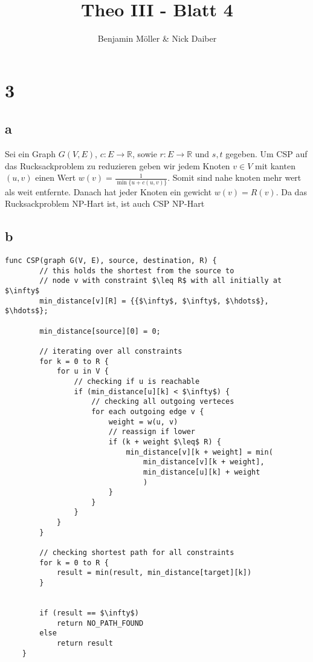 \documentclass{article}
\title{Theo III - Blatt 4}
\author{Benjamin Möller \& Nick Daiber}
\begin{document}
\maketitle
\section*{3}
\subsection*{a}
Sei ein Graph $G(V, E)$, $c:E\rightarrow \mathbb R$, sowie $r:E\rightarrow \mathbb R$ und $s, t$ gegeben.
Um CSP auf das Rucksackproblem zu reduzieren geben wir
jedem Knoten $v\in V$ mit kanten $(u, v)$ einen Wert $w(v) = \frac{1}{\min\{u+c(u,v)\}}$.
Somit sind nahe knoten mehr wert als weit entfernte.
Danach hat jeder Knoten ein gewicht $w(v) = R(v)$.
Da das Rucksackproblem NP-Hart ist, ist auch CSP NP-Hart
\newpage
\subsection*{b}
\begin{lstlisting}[mathescape=true]
    func CSP(graph G(V, E), source, destination, R) {
        // this holds the shortest from the source to
        // node v with constraint $\leq R$ with all initially at $\infty$
        min_distance[v][R] = {{$\infty$, $\infty$, $\hdots$}, $\hdots$};

        min_distance[source][0] = 0;

        // iterating over all constraints
        for k = 0 to R {
            for u in V {
                // checking if u is reachable
                if (min_distance[u][k] < $\infty$) {
                    // checking all outgoing verteces
                    for each outgoing edge v {
                        weight = w(u, v)
                        // reassign if lower
                        if (k + weight $\leq$ R) {
                            min_distance[v][k + weight] = min(
                                min_distance[v][k + weight],
                                min_distance[u][k] + weight
                                )
                        }
                    }
                }
            }
        }

        // checking shortest path for all constraints
        for k = 0 to R {
            result = min(result, min_distance[target][k])
        }


        if (result == $\infty$)
            return NO_PATH_FOUND
        else
            return result
    }
\end{lstlisting}
\end{document}
